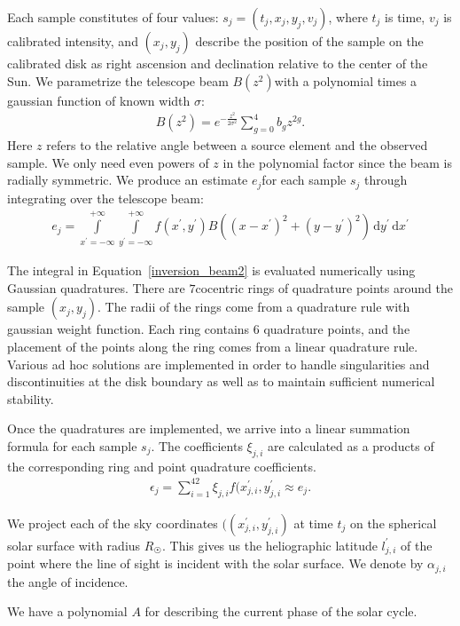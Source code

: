\documentclass{aa}
\newcommand{\eqnl}[2]{\begin{eqnarray}\label{#1}#2\end{eqnarray}}
\newcommand{\intef}[4]{\int \limits_{#1 = #2}^{#3} \! #4 \, \mathrm{d} #1}
\begin{document}
  Each sample constitutes of four values: $s_j = (t_j, x_j, y_j, v_j)$, where $t_j$ is time, $v_j$ is calibrated intensity, 
  and $(x_j,y_j)$ describe the position of the sample on the calibrated disk as right ascension and declination 
  relative to the center of the Sun. We parametrize the telescope beam $B(z^2)$with a polynomial times a gaussian function of known width $\sigma$:
  \eqnl{inversion_beam}{
  B(z^2) = e^{-\frac{z^2}{2 \sigma^2}} \sum \limits_{g=0}^{4} b_g z^{2g} \text{.}
  }
  Here $z$ refers to the relative angle between a source element and the observed sample. We only need even powers of $z$ in the polynomial factor since the beam is radially symmetric. We produce an estimate $e_j$for each sample $s_j$ through integrating over the telescope beam:
  \eqnl{inversion_beam2}{
  e_j = \intef{x^{\prime}}{-\infty}{+\infty}{ \intef{y^{\prime}}{-\infty}{+\infty}{ f(x^{\prime}, y^{\prime}) B \left( \left( x - x^{\prime} \right)^2 + \left( y - y^{\prime} \right)^2 \right)}}
  }

  The integral in Equation~\ref{inversion_beam2} is evaluated numerically using Gaussian quadratures. There are 
  $7$cocentric rings of quadrature points around the sample $(x_j,y_j)$. The radii of the rings come from a quadrature 
  rule with gaussian weight function. Each ring contains $6$ quadrature points, and the placement of the points along the ring comes from a linear 
  quadrature rule. Various ad hoc solutions are implemented in order to handle singularities and discontinuities at the 
  disk boundary as well as to maintain sufficient numerical stability.

  Once the quadratures are implemented, we arrive into a linear summation formula for each sample $s_j$. The coefficients $\xi_{j,i}$ are calculated as a products of the corresponding ring and point quadrature coefficients.
  \eqnl{inversion_beam3}{
  \epsilon_j = \sum \limits_{i=1}^{42} \xi_{j,i} f(x^{\prime}_{j,i}, y^{\prime}_{j,i} \approx e_j \text{.}
  }

   We project each of the sky coordinates $((x^{\prime}_{j,i}, y^{\prime}_{j,i})$ at time $t_j$ on the spherical solar 
   surface with radius $R_{\astrosun}$. This gives us the heliographic latitude $l^{\prime}_{j,i}$ of the point where the line of sight is incident with the solar surface. We denote by $\alpha_{j,i}$ the angle of incidence.
   
  We have a polynomial $A$ for describing the current phase of the solar 
   cycle.
   
  
\end{document}
